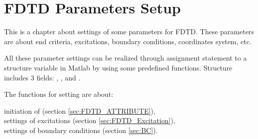 \chapter{FDTD Parameters Setup}\label{chap:FDTD Parameter Setup}
This is a chapter about  settings of  some parameters for FDTD. These parameters are about end criteria, excitations, boundary conditions, coordinates system, etc.

All these parameter settings can be realized through  assignment statement to a structure variable  in Matlab by using some predefined functions.
Structure   \label{para:FDTD}  includes 3 fields:  
	      , \label{para:ATTRIBUTE}
	      , \label{para:Excitation}
	      and . \label{para:BoundaryCond}
	      
The functions for setting    are about:
\begin{myindentpar}[2cm]
initiation of  (section \ref{sec:FDTD_ATTRIBUTE}),\\
settings of  excitations (section \ref{sec:FDTD_Excitation}), \\
settings of boundary conditions (section \ref{sec:BC}).
\end{myindentpar}

